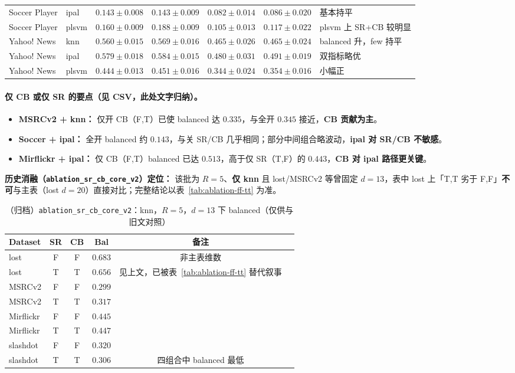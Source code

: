 \documentclass[11pt,a4paper]{article}
\begin{document}
\begin{table}[htbp]
{\begin{tabular}{llccccl}
Soccer Player & ipal & $\mathbf{0.143{\pm}0.008}$ & $0.143{\pm}0.009$ & $0.082{\pm}0.014$ & $0.086{\pm}0.020$ & 基本持平 \\
Soccer Player & plsvm & $0.160{\pm}0.009$ & $\mathbf{0.188{\pm}0.009}$ & $0.105{\pm}0.013$ & $\mathbf{0.117{\pm}0.022}$ & plsvm 上 SR+CB 较明显 \\
Yahoo! News & knn & $0.560{\pm}0.015$ & $\mathbf{0.569{\pm}0.016}$ & $0.465{\pm}0.026$ & $0.465{\pm}0.024$ & balanced 升，few 持平 \\
Yahoo! News & ipal & $0.579{\pm}0.018$ & $\mathbf{0.584{\pm}0.015}$ & $0.480{\pm}0.031$ & $\mathbf{0.491{\pm}0.019}$ & 双指标略优 \\
Yahoo! News & plsvm & $0.444{\pm}0.013$ & $\mathbf{0.451{\pm}0.016}$ & $0.344{\pm}0.024$ & $0.354{\pm}0.016$ & 小幅正 \\
\bottomrule
\end{tabular}}
\end{table}

\paragraph{仅 CB 或仅 SR 的要点（见 CSV，此处文字归纳）。}
\begin{itemize}
  \item \textbf{MSRCv2 + knn：} 仅开 CB（F,T）已使 balanced 达 $0.335$，与全开 $0.345$ 接近，\textbf{CB 贡献为主}。
  \item \textbf{Soccer + ipal：} 全开 balanced 约 $0.143$，与关 SR/CB 几乎相同；部分中间组合略波动，\textbf{ipal 对 SR/CB 不敏感}。
  \item \textbf{Mirflickr + ipal：} 仅 CB（F,T）balanced 已达 $0.513$，高于仅 SR（T,F）的 $0.443$，\textbf{CB 对 ipal 路径更关键}。
\end{itemize}

\noindent\textbf{历史消融（\texttt{ablation\_sr\_cb\_core\_v2}）定位：}
该批为 $R{=}5$、\textbf{仅 knn} 且 lost/MSRCv2 等曾固定 $d{=}13$，表中 lost 上「T,T 劣于 F,F」\textbf{不可}与主表（lost $d{=}20$）直接对比；完整结论以表~\ref{tab:ablation-ff-tt} 为准。

\begin{table}[htbp]
\centering
\caption{（归档）\texttt{ablation\_sr\_cb\_core\_v2}：knn，$R{=}5$，$d{=}13$ 下 balanced（仅供与旧文对照）}
\label{tab:ablation}
\begin{tabular}{lccccc}
\toprule
Dataset & SR & CB & Bal & 备注 \\
\midrule
lost & F & F & $0.683$ & 非主表维数 \\
lost & T & T & $0.656$ & 见上文，已被表~\ref{tab:ablation-ff-tt} 替代叙事 \\
MSRCv2 & F & F & $0.299$ & \\
MSRCv2 & T & T & $0.317$ & \\
Mirflickr & F & F & $0.445$ & \\
Mirflickr & T & T & $0.447$ & \\
slashdot & F & F & $0.320$ & \\
slashdot & T & T & $0.306$ & 四组合中 balanced 最低 \\
\bottomrule
\end{tabular}
\end{table}
\end{document}
